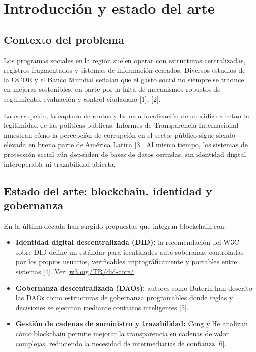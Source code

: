 \documentclass[12pt]{report}
\begin{document}
\chapter{Introducción y estado del arte}

\section{Contexto del problema}
Los programas sociales en la región suelen operar con estructuras centralizadas, registros fragmentados y sistemas de información cerrados. 
Diversos estudios de la OCDE y el Banco Mundial señalan que el gasto social no siempre se traduce en mejoras sostenibles, en parte por la falta de mecanismos robustos de seguimiento, evaluación y control ciudadano [1], [2].

La corrupción, la captura de rentas y la mala focalización de subsidios afectan la legitimidad de las políticas públicas. 
Informes de Transparencia Internacional muestran cómo la percepción de corrupción en el sector público sigue siendo elevada en buena parte de América Latina [3]. 
Al mismo tiempo, los sistemas de protección social aún dependen de bases de datos cerradas, sin identidad digital interoperable ni trazabilidad abierta.

\section{Estado del arte: blockchain, identidad y gobernanza}
En la última década han surgido propuestas que integran blockchain con:
\begin{itemize}
    \item \textbf{Identidad digital descentralizada (DID):} la recomendación del W3C sobre DID define un estándar para identidades auto-soberanas, controladas por los propios usuarios, verificables criptográficamente y portables entre sistemas [4]. Ver: \href{https://www.w3.org/TR/did-core/}{w3.org/TR/did-core/}.
    \item \textbf{Gobernanza descentralizada (DAOs):} autores como Buterin han descrito las DAOs como estructuras de gobernanza programables donde reglas y decisiones se ejecutan mediante contratos inteligentes [5].
    \item \textbf{Gestión de cadenas de suministro y trazabilidad:} Cong y He analizan cómo blockchain permite mejorar la transparencia en cadenas de valor complejas, reduciendo la necesidad de intermediarios de confianza [6].
\end{itemize}
\end{document}
